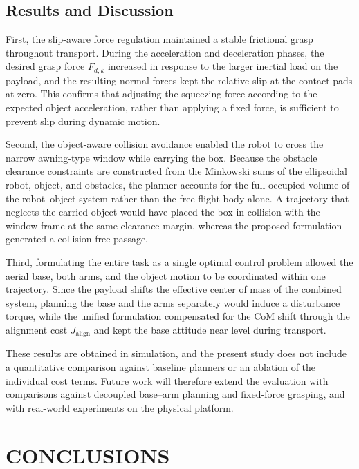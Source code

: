 \documentclass[letterpaper, 10 pt, conference]{ieeeconf}  %
\begin{document}
\subsection{Results and Discussion}


First, the slip-aware force regulation maintained a stable frictional grasp throughout transport.
During the acceleration and deceleration phases, the desired grasp force $F_{d,k}$ increased in response to the larger inertial load on the payload, and the resulting normal forces kept the relative slip at the contact pads at zero.
This confirms that adjusting the squeezing force according to the expected object acceleration, rather than applying a fixed force, is sufficient to prevent slip during dynamic motion.

Second, the object-aware collision avoidance enabled the robot to cross the narrow awning-type window while carrying the box.
Because the obstacle clearance constraints are constructed from the Minkowski sums of the ellipsoidal robot, object, and obstacles, the planner accounts for the full occupied volume of the robot--object system rather than the free-flight body alone.
A trajectory that neglects the carried object would have placed the box in collision with the window frame at the same clearance margin, whereas the proposed formulation generated a collision-free passage.

Third, formulating the entire task as a single optimal control problem allowed the aerial base, both arms, and the object motion to be coordinated within one trajectory.
Since the payload shifts the effective center of mass of the combined system, planning the base and the arms separately would induce a disturbance torque, while the unified formulation compensated for the CoM shift through the alignment cost $J_{\mathrm{align}}$ and kept the base attitude near level during transport.

These results are obtained in simulation, and the present study does not include a quantitative comparison against baseline planners or an ablation of the individual cost terms.
Future work will therefore extend the evaluation with comparisons against decoupled base--arm planning and fixed-force grasping, and with real-world experiments on the physical platform.
\section{CONCLUSIONS}
\end{document}

